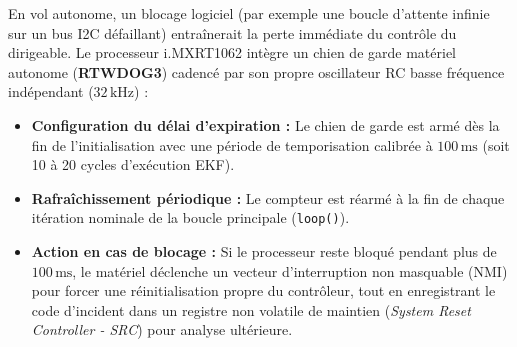\documentclass[../Materiel.tex]{subfiles}
\begin{document}
En vol autonome, un blocage logiciel (par exemple une boucle d'attente infinie sur un bus I2C défaillant) entraînerait la perte immédiate du contrôle du dirigeable. Le processeur i.MXRT1062 intègre un chien de garde matériel autonome (\textbf{RTWDOG3}) cadencé par son propre oscillateur RC basse fréquence indépendant ($32\,\text{kHz}$) :
\begin{itemize}
    \item \textbf{Configuration du délai d'expiration :} Le chien de garde est armé dès la fin de l'initialisation avec une période de temporisation calibrée à \textbf{$100\,\text{ms}$} (soit 10 à 20 cycles d'exécution EKF).
    \item \textbf{Rafraîchissement périodique :} Le compteur est réarmé à la fin de chaque itération nominale de la boucle principale (\lstinline|loop()|).
    \item \textbf{Action en cas de blocage :} Si le processeur reste bloqué pendant plus de $100\,\text{ms}$, le matériel déclenche un vecteur d'interruption non masquable (NMI) pour forcer une réinitialisation propre du contrôleur, tout en enregistrant le code d'incident dans un registre non volatile de maintien (\textit{System Reset Controller - SRC}) pour analyse ultérieure.
\end{itemize}
\end{document}
